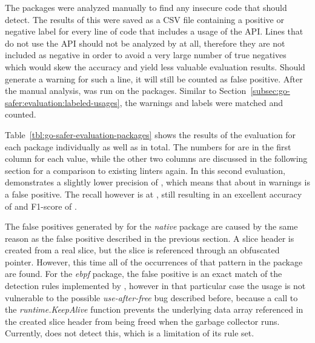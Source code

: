 

The  packages were analyzed manually to find any insecure code that \toolSafer{} should detect.
The results of this were saved as a \acrshort{CSV} file containing a positive or negative label for every line of code
that includes a usage of the \unsafe{} \acrshort{API}.
Lines that do not use the \acrshort{API} should not be analyzed by \toolSafer{} at all, therefore they are not included
as negative in order to avoid a very large number of true negatives which would skew the accuracy and yield less
valuable evaluation results.
Should \toolSafer{} generate a warning for such a line, it will still be counted as false positive.
After the manual analysis, \toolSafer{} was run on the packages.
Similar to Section~\ref{subsec:go-safer:evaluation:labeled-usages}, the warnings and labels were matched and counted.



Table~\ref{tbl:go-safer-evaluation-packages} shows the results of the evaluation for each package individually as well
as in total.
The numbers for \toolSafer{} are in the first column for each value, while the other two columns are discussed in the
following section for a comparison to existing linters again.
In this second evaluation, \toolSafer{} demonstrates a slightly lower precision of , which means that
about  in  warnings is a false positive.
The recall however is at , still resulting in an excellent accuracy of  and F1-score of
.

The false positives generated by \toolSafer{} for the \textit{native} package are caused by the same reason as the false
positive described in the previous section.
A slice header is created from a real slice, but the slice is referenced through an obfuscated pointer.
However, this time all of the occurrences of that pattern in the package are found.
For the \textit{ebpf} package, the false positive is an exact match of the detection rules implemented by \toolSafer{},
however in that particular case the usage is not vulnerable to the possible \textit{use-after-free} bug described
before, because a call to the \textit{runtime.KeepAlive} function prevents the underlying data array referenced in the
created slice header from being freed when the garbage collector runs.
Currently, \toolSafer{} does not detect this, which is a limitation of its rule set.

